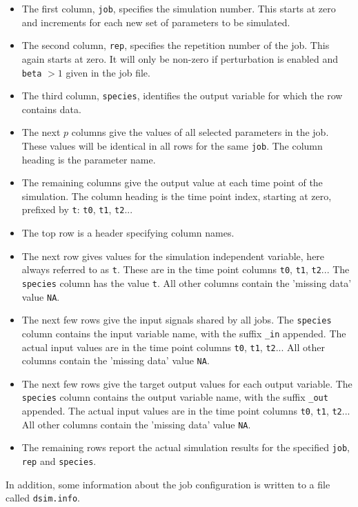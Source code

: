 \documentclass[a4paper,11pt]{article}
\begin{document}
\begin{itemize}
\item The first column, \texttt{job}, specifies the simulation number. This starts at zero and increments for each new set of parameters to be simulated.
\item The second column, \texttt{rep}, specifies the repetition number of the job. This again starts at zero. It will only be non-zero if perturbation is enabled and \texttt{beta} $>1$ given in the job file.
\item The third column, \texttt{species}, identifies the output variable for which the row contains data.
\item The next $p$ columns give the values of all selected parameters in the job. These values will be identical in all rows for the same \texttt{job}. The column heading is the parameter name.
\item The remaining columns give the output value at each time point of the simulation. The column heading is the time point index, starting at zero, prefixed by \texttt{t}: \texttt{t0}, \texttt{t1}, \texttt{t2}...
\item The top row is a header specifying column names.
\item The next row gives values for the simulation independent variable, here always referred to as \texttt{t}. These are in the time point columns \texttt{t0}, \texttt{t1}, \texttt{t2}... The \texttt{species} column has the value \texttt{t}. All other columns contain the 'missing data' value \texttt{NA}.
\item The next few rows give the input signals shared by all jobs. The \texttt{species} column contains the input variable name, with the suffix \texttt{\_in} appended. The actual input values are in the time point columns \texttt{t0}, \texttt{t1}, \texttt{t2}...  All other columns contain the 'missing data' value \texttt{NA}.
\item The next few rows give the target output values for each output variable. The \texttt{species} column contains the output variable name, with the suffix \texttt{\_out} appended. The actual input values are in the time point columns \texttt{t0}, \texttt{t1}, \texttt{t2}...  All other columns contain the 'missing data' value \texttt{NA}.
\item The remaining rows report the actual simulation results for the specified \texttt{job}, \texttt{rep} and \texttt{species}.
\end{itemize}
In addition, some information about the job configuration is written to a file called \texttt{dsim.info}.
\end{document}
